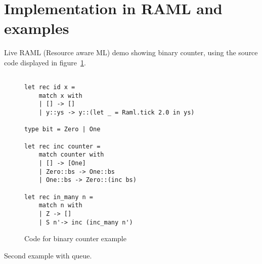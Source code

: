 \documentclass{article}
\begin{document}
\section{Implementation in RAML and examples}
Live RAML (Resource aware ML) demo showing binary counter, using the source code displayed in figure~\ref{code:binary-counter}.
\begin{figure}[ht]
\begin{lstlisting}[language=caml,frame=single,basicstyle=\footnotesize]

let rec id x =
    match x with
    | [] -> []
    | y::ys -> y::(let _ = Raml.tick 2.0 in ys)

type bit = Zero | One

let rec inc counter = 
    match counter with
    | [] -> [One]
    | Zero::bs -> One::bs 
    | One::bs -> Zero::(inc bs)

let rec in_many n = 
    match n with
    | Z -> []
    | S n'-> inc (inc_many n')
\end{lstlisting}
\label{code:binary-counter}
\caption{Code for binary counter example}
\end{figure}
Second example with queue.
\end{document}
